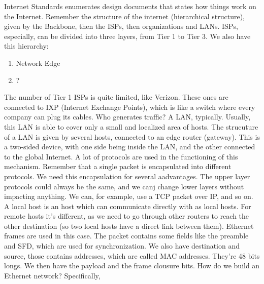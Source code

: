 Internet Standards enumerates design documents that
states how things work on the Internet. \newline
\newline Remember the structure of the internet 
(hierarchical structure), 
given by the Backbone, then the ISPs, then organizations 
and LANs. ISPs, especially, can be divided into three 
layers, from Tier 1 to Tier 3. \newline
\newline We also have this hierarchy:
\begin{enumerate}
    \item Network Edge
    \item ?
\end{enumerate}

The number of Tier 1 ISPs is quite limited, like Verizon. 
These ones are connected to IXP (Internet Exchange Points),
which is like a switch where every company can plug its 
cables. \newline
\newline Who generates traffic? A LAN, typically. Usually, 
this LAN is able to cover only a small and localized 
area of hosts. The strucuture of a LAN is given by 
several hosts, connected to an edge router (gateway). 
This is a two-sided device, with one side being inside 
the LAN, and the other connected to the global Internet. 
A lot of protocols are used in the functioning of this 
mechanism. Remember that a single packet is encapsulated 
into different protocols. We need this encapsulation 
for several aadvantages. The upper layer protocols could 
always be the same, and we canj change lower layers 
without impacting anything. We can, for example, use a 
TCP packet over IP, and so on. \newline
\newline A local host is an host which can communicate 
directly with as local hosts. For remote hosts it's different, 
as we need to go through other routers to reach 
the other destination (so two local hosts have a direct
link between them). \newline
\newline Ethernet frames are used in this case. The
packet contains some fields like the preamble and SFD, 
which are used for synchronization. We also have destination 
and source, those contains addresses, which are called 
MAC addresses. They're 48 bits longs. We then have the 
payload and the frame clousure bits. \newline 
How do we build an Ethernet network? Specifically, 

